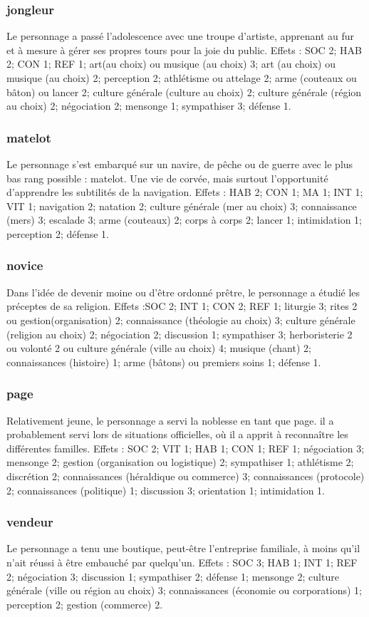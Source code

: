\documentclass[10pt,a4paper,twocolumn]{book}
\begin{document}
\subsubsection{jongleur}
Le personnage a passé l’adolescence avec une troupe d’artiste, apprenant au fur et à mesure à gérer ses propres tours pour la joie du public.
Effets : SOC 2; HAB 2; CON 1; REF 1; art(au choix) ou musique (au choix) 3; art (au choix) ou musique (au choix) 2; perception 2; athlétisme ou attelage 2; arme (couteaux ou bâton) ou lancer 2; culture générale (culture au choix) 2; culture générale (région au choix) 2; négociation 2; mensonge 1; sympathiser 3; défense 1.
\subsubsection{matelot}
Le personnage s’est embarqué sur un navire, de pêche ou de guerre avec le plus bas rang possible : matelot. Une vie de corvée, mais surtout l’opportunité d’apprendre les subtilités de la navigation.
Effets : HAB 2; CON 1; MA 1; INT 1; VIT 1; navigation 2; natation 2; culture générale (mer au choix) 3; connaissance (mers) 3; escalade 3; arme (couteaux) 2; corps à corps 2; lancer 1; intimidation 1; perception 2; défense 1.
\subsubsection{novice}
Dans l’idée de devenir moine ou d’être ordonné prêtre, le personnage a étudié les préceptes de sa religion.
Effets :SOC 2; INT 1; CON 2; REF 1; liturgie 3; rites 2 ou gestion(organisation) 2; connaissance (théologie au choix) 3; culture générale (religion au choix) 2; négociation 2; discussion 1; sympathiser 3; herboristerie 2 ou volonté 2 ou culture générale (ville au choix) 4; musique (chant) 2; connaissances (histoire) 1; arme (bâtons) ou premiers soins 1; défense 1. 
\subsubsection{page}
Relativement jeune, le personnage a servi la noblesse en tant que page. il a probablement servi lors de situations officielles, où il a apprit à reconnaître les différentes familles.
Effets : SOC 2; VIT 1; HAB 1; CON 1; REF 1; négociation 3; mensonge 2; gestion (organisation ou logistique) 2; sympathiser 1; athlétisme 2; discrétion 2; connaissances (héraldique ou commerce) 3; connaissances (protocole) 2; connaissances (politique) 1; discussion 3; orientation 1; intimidation 1.
\subsubsection{vendeur}
Le personnage a tenu une boutique, peut-être l’entreprise familiale, à moins qu’il n’ait réussi à être embauché par quelqu’un.
Effets : SOC 3; HAB 1; INT 1; REF 2; négociation  3; discussion 1; sympathiser 2; défense 1; mensonge 2; culture générale (ville ou région au choix) 3; connaissances (économie ou corporations) 1; perception  2; gestion (commerce) 2.
\end{document}
